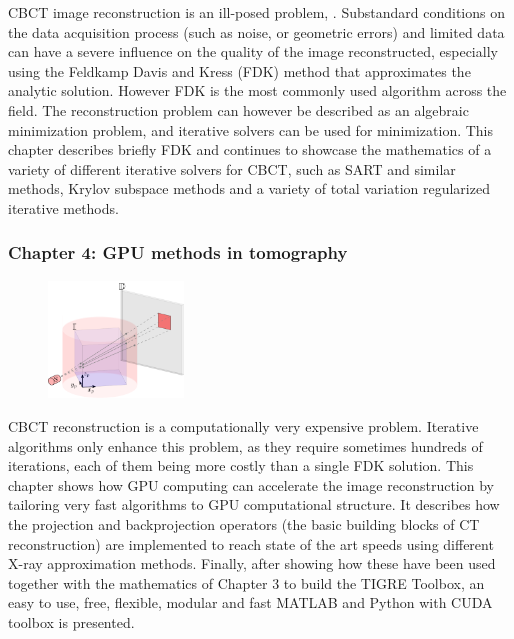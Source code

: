 CBCT image reconstruction is an ill-posed problem, . Substandard conditions on the data acquisition process (such as noise, or geometric errors) and limited data can have a severe influence on the quality of the image reconstructed, especially using the Feldkamp Davis and Kress (FDK) method that approximates the analytic solution. However FDK is the most commonly used algorithm across the field. The reconstruction problem can however be described as an algebraic minimization problem, and iterative solvers can be used for minimization. This chapter describes briefly FDK and continues to showcase the mathematics of a variety of different iterative solvers for CBCT, such as SART and similar methods, Krylov subspace methods and a variety of total variation regularized iterative methods.
\FloatBarrier
\subsubsection{Chapter 4: GPU methods in tomography}



\begin{figure}
\centering
\includegraphics[width=0.32\textwidth]{GPUmethods/projcoord-figure0.pdf}
\end{figure}

CBCT reconstruction is a computationally very expensive problem. Iterative algorithms only enhance this problem, as they require sometimes hundreds of iterations, each of them being more costly than a single FDK solution. This chapter shows how GPU computing can accelerate the image reconstruction by tailoring very fast algorithms to GPU computational structure. It describes how the projection and backprojection operators (the basic building blocks of CT reconstruction) are implemented to reach state of the art speeds using different X-ray approximation methods. Finally, after showing how these have been used together with the mathematics of Chapter 3 to build the TIGRE Toolbox, an easy to use, free, flexible, modular and fast MATLAB and Python with CUDA toolbox is presented. 
\FloatBarrier


